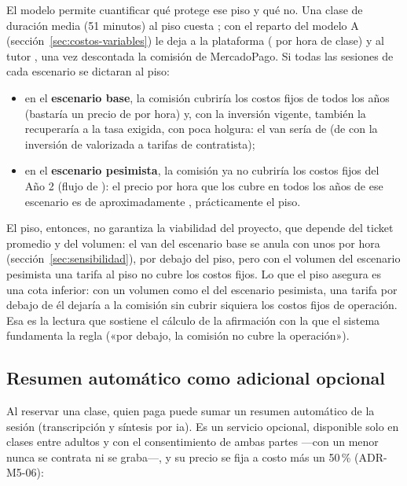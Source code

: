El modelo permite cuantificar qué protege ese piso y qué no. Una clase de
duración media (51 minutos) al piso cuesta ; con el reparto del
modelo A (sección~\ref{sec:costos-variables}) le deja a la plataforma
 ( por hora de clase) y al tutor , una vez
descontada la comisión de MercadoPago. Si todas las sesiones de cada
escenario se dictaran al piso:

\begin{itemize}
    \item en el \textbf{escenario base}, la comisión cubriría los costos
          fijos de todos los años (bastaría un precio de  por
          hora) y, con la inversión vigente, también la recuperaría a la
          tasa exigida, con poca holgura: el \gls{van} sería de
           (de  con la inversión de 
          valorizada a tarifas de contratista);
    \item en el \textbf{escenario pesimista}, la comisión ya no cubriría
          los costos fijos del Año 2 (flujo de ): el precio por
          hora que los cubre en todos los años de ese escenario es de
          aproximadamente , prácticamente el piso.
\end{itemize}

El piso, entonces, no garantiza la viabilidad del proyecto, que depende
del ticket promedio y del volumen: el \gls{van} del escenario base se
anula con unos  por hora (sección~\ref{sec:sensibilidad}),
por debajo del piso, pero con el volumen del escenario pesimista una
tarifa al piso no cubre los costos fijos. Lo que el piso asegura es una cota inferior: con un volumen como el del
escenario pesimista, una tarifa por debajo de él dejaría a la comisión sin
cubrir siquiera los costos fijos de operación. Esa es la lectura que
sostiene el cálculo de la afirmación con la que el sistema fundamenta la
regla («por debajo, la comisión no cubre la operación»).

\subsection{Resumen automático como adicional opcional}\label{sec:adicional-resumen}

Al reservar una clase, quien paga puede sumar un resumen automático de la
sesión (transcripción y síntesis por \gls{ia}). Es un servicio opcional,
disponible solo en clases entre adultos y con el consentimiento de ambas
partes —con un menor nunca se contrata ni se graba—, y su precio se fija a
costo más un 50\,\% (ADR-M5-06):

